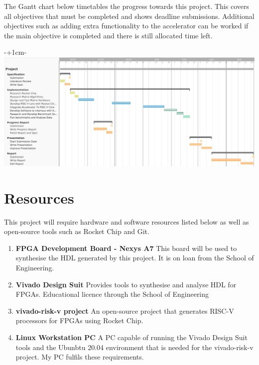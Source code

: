 \documentclass[a4paper,fleqn,12pt]{article}
\begin{document}
	The Gantt chart below timetables the progress towards this project. This covers all objectives that must be completed and shows deadline submissions. Additional objectives such as adding extra functionality to the accelerator can be worked if the main objective is completed and there is still allocated time left.
	
	\begin{adjustwidth}{-\oddsidemargin-1in+1cm}{-\rightmargin}
		\centering
		\includegraphics[width=\paperwidth-2cm, frame]{./timeline.png}
	\end{adjustwidth}
	
	\section{Resources}
	This project will require hardware and software resources listed below as well as open-source tools such as Rocket Chip and Git.
	\begin{enumerate}
		\item \textbf{FPGA Development Board - Nexys A7} \newline
		This board will be used to synthesise the HDL generated by this project. It is on loan from the School of Engineering.
		\item \textbf{Vivado Design Suit} \newline
		Provides tools to synthesise and analyse HDL for FPGAs. Educational licence through the School of Engineering
		\item \textbf{vivado-risk-v project} \citep{vivado-risk-v} \newline
		An open-source project that generates RISC-V processors for FPGAs using Rocket Chip.
		\item \textbf{Linux Workstation PC} \newline
		A PC capable of running the Vivado Design Suit tools and the Ubunbtu 20.04 environment that is needed for the vivado-risk-v project. My PC fulfils these requirements.
	\end{enumerate}
	
\end{document}
